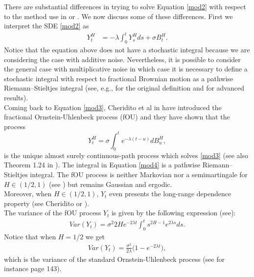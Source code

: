 \documentclass[smallextended]{svjour3}
\begin{document}
There are substantial differences in trying to solve Equation \eqref{mod2} with 
respect to the method use
in \cite{mi-pr} or \cite{gi-or-be}. We now discuss some of these differences. 
First we interpret the SDE \eqref{mod2} as
\begin{align}
Y_t^H&=-\lambda\int_0^t Y_s^Hds+\sigma B_t^H.\label{mod3}
\end{align}
Notice that the equation above does not have a stochastic integral because we 
are considering the
case with additive noise.
Nevertheless, it is possible to consider the general case with multiplicative 
noise in which case
it is necessary to define a stochastic integral with respect to fractional 
Brownian motion as a pathwise Riemann–Stieltjes
integral (see, e.g., \cite{yo} for the original definition and \cite{du-no} for 
advanced results). \\

Coming back to Equation \eqref{mod3}, Cheridito et al in \cite{ch-ka-ma} have 
introduced the
fractional Ornstein-Uhlenbeck process (fOU) and they have shown that the process
\begin{equation}
Y_t^H=\sigma \int_0^t e^{-\lambda(t-u)} dB_u^H,\label{mod4}
\end{equation}
is the unique almost surely continuous-path process which solves \eqref{mod3} 
(see also Theorem 1.24 in \cite{ra}).
The integral in Equation \eqref{mod4} is a
pathwise Riemann–Stieltjes integral.  The fOU process is neither Markovian nor 
a semimartingale for $H \in(1/2,1)$ (see \cite{du-no}) but remains
Gaussian and ergodic.\\

Moreover, when $H \in(1/2,1)$, $Y_t$ even presents the long-range dependence 
property (see Cheridito
\cite{ch-ka-ma} or  \cite{ra}).\\

The variance of the fOU process $Y_t$ is given by the following expression 
(see\cite{ze-ch-ya}):
\begin{align}
Var(Y_t)= \sigma^2 2H e^{-2\lambda t} \int_0^t s^{2H-1} e^{2\lambda s} 
ds.\label{var-fou}
\end{align}
Notice that when $H=1/2$ we get
\begin{align}
Var(Y_t)= \frac{\sigma^2}{2\lambda}  \big(1-e^{-2\lambda t}\big),
\end{align}
which is the variance of the standard Ornstein-Uhlenbeck process (see for 
instance \cite{mik} page 143). \\
\end{document}

